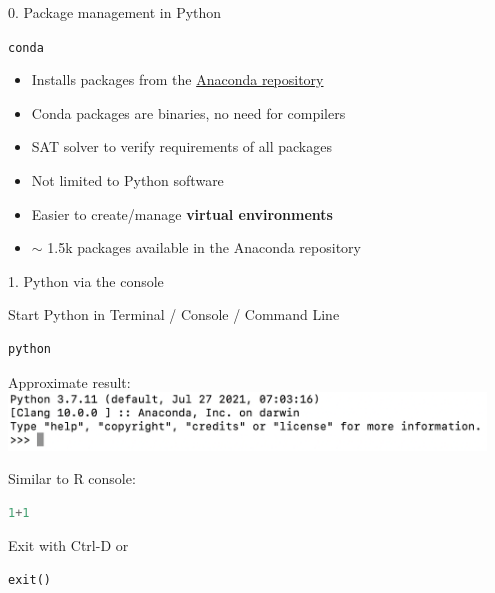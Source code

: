 
\begin{vbframe}{0. Package management in Python}

\vfill

\texttt{conda}

\begin{itemize}
		\item Installs packages from the \href{https://repo.anaconda.com/}{Anaconda repository}
		\item Conda packages are binaries, no need for compilers
		\item SAT solver to verify requirements of all packages
		\item Not limited to Python software
		\item Easier to create/manage \textbf{virtual environments}
		\item $\sim$ 1.5k packages available in the Anaconda repository
\end{itemize}

\vfill

\end{vbframe}


\begin{vbframe}{1. Python via the console}

\vfill

Start Python in Terminal / Console / Command Line
\vspace{-.2cm}
\begin{lstlisting}[language=bash]
python
\end{lstlisting}

Approximate result:\\

\includegraphics[width=0.95\textwidth]{figure/python_terminal.png}

Similar to R console:
\vspace{-.2cm}
\begin{lstlisting}[language=python]
1+1
\end{lstlisting}

Exit with Ctrl-D or
\vspace{-.2cm}
\begin{lstlisting}[language=python]
exit()
\end{lstlisting}

\vfill

\end{vbframe}

